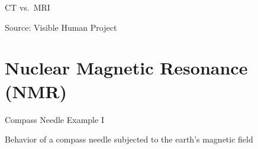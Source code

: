 \begin{frame}[c]{CT vs.~MRI}
    \begin{figure}
        \centering
    \end{figure}

    {\scriptsize *Source: Visible Human Project}
\end{frame}




\section{Nuclear Magnetic Resonance (NMR)}%
\label{sec:nuclear_magnetic_resonance_nmr}

\begin{frame}{Compass Needle Example I}

Behavior of a compass needle subjected to the earth's magnetic field

\begin{center}
\begingroup
{}%
\only<1>{}%
\only<2>{}%
\only<3>{}%
%
\endgroup
\end{center}

\end{frame}

